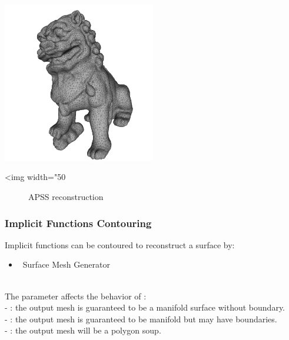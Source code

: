 \begin{center}
    \label{Surface_reconstruction_3-fig-APSS}
    \begin{ccTexOnly}
        \includegraphics[width=0.5\textwidth]{Surface_reconstruction_3/APSS} %
    \end{ccTexOnly}
    \begin{ccHtmlOnly}
        <img width="50%
    \end{ccHtmlOnly}
    \begin{figure}[h]
        \caption{APSS reconstruction}
    \end{figure}
\end{center}


\subsubsection{Implicit Functions Contouring}

Implicit functions can be contoured to reconstruct a surface by:

\begin{itemize}
\item \cgal\ Surface Mesh Generator~\cite{cgal:ry-gsddrm-06,cgal:bo-pgsms-05}
\end{itemize}

  \\

The parameter  affects the behavior of : \\
- : the output mesh is guaranteed to be a manifold
surface without boundary.\\
- : the output mesh is guaranteed to be
manifold but may have boundaries.\\
- : the output mesh will be a polygon soup.


